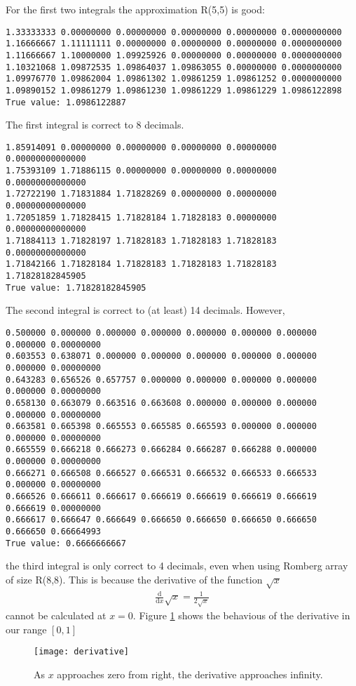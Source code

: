 \documentclass[a4paper,12pt]{scrartcl}
\begin{document}
For the first two integrals the approximation R(5,5) is good:
\begin{verbatim}
1.33333333 0.00000000 0.00000000 0.00000000 0.00000000 0.0000000000
1.16666667 1.11111111 0.00000000 0.00000000 0.00000000 0.0000000000
1.11666667 1.10000000 1.09925926 0.00000000 0.00000000 0.0000000000
1.10321068 1.09872535 1.09864037 1.09863055 0.00000000 0.0000000000
1.09976770 1.09862004 1.09861302 1.09861259 1.09861252 0.0000000000
1.09890152 1.09861279 1.09861230 1.09861229 1.09861229 1.0986122898
True value: 1.0986122887
\end{verbatim}
The first integral is correct to 8 decimals.
\begin{verbatim}
1.85914091 0.00000000 0.00000000 0.00000000 0.00000000 0.00000000000000
1.75393109 1.71886115 0.00000000 0.00000000 0.00000000 0.00000000000000
1.72722190 1.71831884 1.71828269 0.00000000 0.00000000 0.00000000000000
1.72051859 1.71828415 1.71828184 1.71828183 0.00000000 0.00000000000000
1.71884113 1.71828197 1.71828183 1.71828183 1.71828183 0.00000000000000
1.71842166 1.71828184 1.71828183 1.71828183 1.71828183 1.71828182845905
True value: 1.71828182845905
\end{verbatim}
The second integral is correct to (at least) 14 decimals. However,
\begin{verbatim}
0.500000 0.000000 0.000000 0.000000 0.000000 0.000000 0.000000 0.000000 0.00000000
0.603553 0.638071 0.000000 0.000000 0.000000 0.000000 0.000000 0.000000 0.00000000
0.643283 0.656526 0.657757 0.000000 0.000000 0.000000 0.000000 0.000000 0.00000000
0.658130 0.663079 0.663516 0.663608 0.000000 0.000000 0.000000 0.000000 0.00000000
0.663581 0.665398 0.665553 0.665585 0.665593 0.000000 0.000000 0.000000 0.00000000
0.665559 0.666218 0.666273 0.666284 0.666287 0.666288 0.000000 0.000000 0.00000000
0.666271 0.666508 0.666527 0.666531 0.666532 0.666533 0.666533 0.000000 0.00000000
0.666526 0.666611 0.666617 0.666619 0.666619 0.666619 0.666619 0.666619 0.00000000
0.666617 0.666647 0.666649 0.666650 0.666650 0.666650 0.666650 0.666650 0.66664993
True value: 0.6666666667

\end{verbatim}
the third integral is only correct to 4 decimals, even when using
Romberg array of size R(8,8). This is because the derivative of the
function $\sqrt{x}$ 
\begin{align*}
    \frac{\mathrm{d}}{\mathrm{d}x}\sqrt{x}=\frac{1}{2\sqrt{x}}
\end{align*}
cannot be calculated at $x=0$. Figure \ref{fig:derivative}
shows the behavious of the derivative in our range $[0,1]$
\begin{figure}[h!]
  \centering
    \texttt{[image: derivative]}
  \caption{As $x$ approaches zero from right, the derivative approaches
infinity.}
  \label{fig:derivative}
\end{figure}
\end{document}
